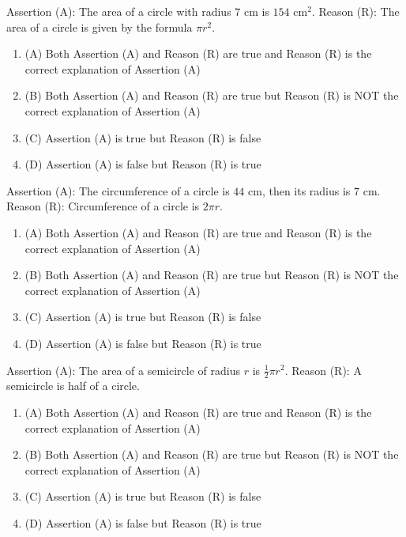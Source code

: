 \documentclass[12pt,a4paper]{exam}
\begin{document}
\begin{questions}
\question[1] Assertion (A): The area of a circle with radius $7$ cm is $154$ cm$^2$. Reason (R): The area of a circle is given by the formula $\pi r^2$.
\begin{enumerate}[label=(\Alph*)]
  \item (A) Both Assertion (A) and Reason (R) are true and Reason (R) is the correct explanation of Assertion (A)
  \item (B) Both Assertion (A) and Reason (R) are true but Reason (R) is NOT the correct explanation of Assertion (A)
  \item (C) Assertion (A) is true but Reason (R) is false
  \item (D) Assertion (A) is false but Reason (R) is true
\end{enumerate}
\vspace{0.15cm}

\question[1] Assertion (A): The circumference of a circle is $44$ cm, then its radius is $7$ cm. Reason (R): Circumference of a circle is $2\pi r$.
\begin{enumerate}[label=(\Alph*)]
  \item (A) Both Assertion (A) and Reason (R) are true and Reason (R) is the correct explanation of Assertion (A)
  \item (B) Both Assertion (A) and Reason (R) are true but Reason (R) is NOT the correct explanation of Assertion (A)
  \item (C) Assertion (A) is true but Reason (R) is false
  \item (D) Assertion (A) is false but Reason (R) is true
\end{enumerate}
\vspace{0.15cm}

\question[1] Assertion (A): The area of a semicircle of radius $r$ is $\frac{1}{2}\pi r^2$. Reason (R): A semicircle is half of a circle.
\begin{enumerate}[label=(\Alph*)]
  \item (A) Both Assertion (A) and Reason (R) are true and Reason (R) is the correct explanation of Assertion (A)
  \item (B) Both Assertion (A) and Reason (R) are true but Reason (R) is NOT the correct explanation of Assertion (A)
  \item (C) Assertion (A) is true but Reason (R) is false
  \item (D) Assertion (A) is false but Reason (R) is true
\end{enumerate}
\vspace{0.15cm}


\end{questions}
\end{document}
